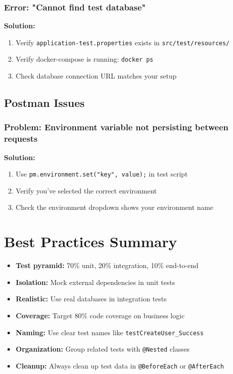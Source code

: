\documentclass[12pt,a4paper]{article}
\begin{document}
\subsubsection{Error: "Cannot find test database"}

\begin{warningbox}
\textbf{Solution:}
\begin{enumerate}
    \item Verify \texttt{application-test.properties} exists in \texttt{src/test/resources/}
    \item Verify docker-compose is running: \texttt{docker ps}
    \item Check database connection URL matches your setup
\end{enumerate}
\end{warningbox}

\subsection{Postman Issues}

\subsubsection{Problem: Environment variable not persisting between requests}

\begin{warningbox}
\textbf{Solution:}
\begin{enumerate}
    \item Use \texttt{pm.environment.set("key", value);} in test script
    \item Verify you've selected the correct environment
    \item Check the environment dropdown shows your environment name
\end{enumerate}
\end{warningbox}

\section{Best Practices Summary}

\begin{itemize}
    \item \textbf{Test pyramid:} 70\% unit, 20\% integration, 10\% end-to-end
    \item \textbf{Isolation:} Mock external dependencies in unit tests
    \item \textbf{Realistic:} Use real databases in integration tests
    \item \textbf{Coverage:} Target 80\% code coverage on business logic
    \item \textbf{Naming:} Use clear test names like \texttt{testCreateUser\_Success}
    \item \textbf{Organization:} Group related tests with \texttt{@Nested} classes
    \item \textbf{Cleanup:} Always clean up test data in \texttt{@BeforeEach} or \texttt{@AfterEach}
\end{itemize}
\end{document}
